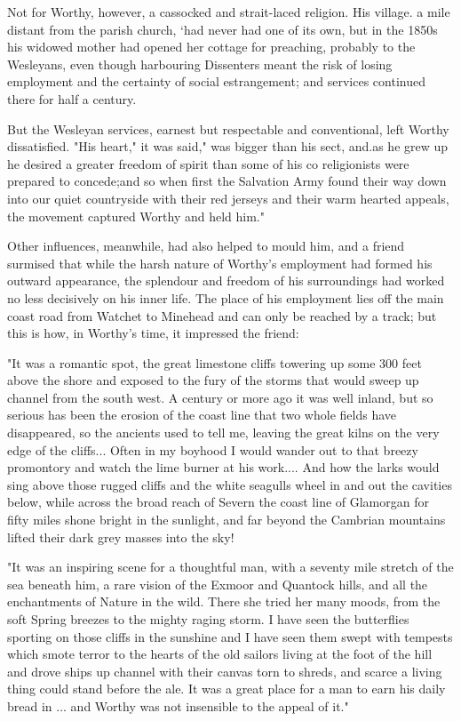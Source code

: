 Not for Worthy, however, a cassocked and strait-laced religion. His village. a mile distant from the parish church, `had never had one of its own, but in the 1850s his widowed mother had opened her cottage for preaching, probably to the Wesleyans, even though harbouring Dissenters meant the risk of losing employment and the certainty of social estrangement; and services continued there for half a century. 

But the Wesleyan services, earnest but respectable and conventional, left Worthy dissatisfied. "His heart," it was said," was bigger than his sect, and.as he grew up he desired a greater freedom of spirit than some of his co religionists were prepared to concede;and so when first the Salvation Army found their way down into our quiet countryside with their red jerseys and their warm hearted appeals, the movement captured Worthy and held him."	 

Other influences, meanwhile, had also helped to mould him, and a friend surmised that while the harsh nature of Worthy's employment had formed his outward appearance, the splendour and freedom of his surroundings had worked no less decisively on his inner life. The place of his employment lies off the main coast road from Watchet to Minehead and can only be reached by a track; but this is how, in Worthy's time, it impressed the friend: 

"It was a romantic spot, the great limestone cliffs towering up some 300 feet above the shore and exposed to the fury of the storms that would sweep up channel from the south west. A century or more ago it was well inland, but so serious has been the erosion of the coast line that two whole fields have disappeared, so the ancients used to tell me, leaving the great kilns on the very edge of the cliffs... Often in my boyhood I would wander out to that breezy promontory and watch the lime burner at his work.... And how the larks would sing above those rugged cliffs and the white seagulls wheel in and out the cavities below, while across the broad reach of Severn the coast line of Glamorgan for fifty miles shone bright in the sunlight, and far beyond the Cambrian mountains lifted their dark grey masses into the sky! 

"It was an inspiring scene for a thoughtful man, with a seventy mile stretch of the sea beneath him, a rare vision of the Exmoor and Quantock hills, and all the enchantments of Nature in the wild. There she tried her many moods, from the soft Spring breezes to the mighty raging storm. I have seen the butterflies sporting on those cliffs in the sunshine and I have seen them swept with tempests which smote terror to the hearts of the old sailors living at the foot of the hill and drove ships up channel with their canvas torn to shreds, and scarce a living thing could stand before the ale. It was a great place for a man to earn his daily bread in ... and Worthy was not insensible to the appeal of it." 

